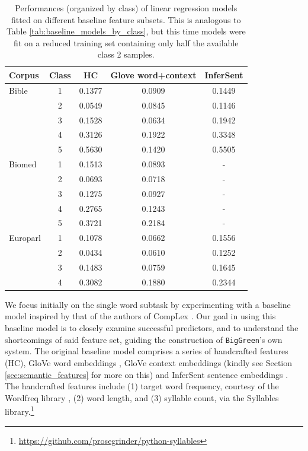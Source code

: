 \documentclass{dcthesis}
\theoremstyle{definition}
\theoremstyle{remark}
\begin{document}
\begin{table}
  \centering
  \begin{tabular}{l|c|c|c|c}
  \hline
  \textbf{Corpus} & \textbf{Class} & \textbf{HC} & \textbf{Glove word+context} & \textbf{InferSent} \\
  \hline
  Bible & 1 & 0.1377 & 0.0909 & 0.1449 \\
  & 2 & 0.0549 & 0.0845 & 0.1146 \\
  & 3 & 0.1528 & 0.0634 & 0.1942 \\
  & 4 & 0.3126 & 0.1922 & 0.3348 \\
  & 5 & 0.5630 & 0.1420 & 0.5505 \\
  \hline
  Biomed & 1 & 0.1513 & 0.0893 & - \\
  & 2 & 0.0693 & 0.0718 & - \\
  & 3 & 0.1275 & 0.0927 & - \\
  & 4 & 0.2765 & 0.1243 & - \\
  & 5 & 0.3721 & 0.2184 & - \\
  \hline
  Europarl & 1 & 0.1078 & 0.0662 & 0.1556 \\
  & 2 & 0.0434 & 0.0610 & 0.1252 \\
  & 3 & 0.1483 & 0.0759 & 0.1645 \\
  & 4 & 0.3082 & 0.1880 & 0.2344 \\
  \hline
  \end{tabular}
  \caption{\label{tab:baseline_models_by_class_reduced} 
  Performances (organized by class) of linear regression models fitted on different baseline feature subsets. This is analogous to Table \ref{tab:baseline_models_by_class}, but this time models were fit on a reduced training set containing only half the available class 2 samples.}
\end{table}

We focus initially on the single word subtask by experimenting with a baseline model inspired by that of the authors of CompLex \citep{shardlow2020complex}. Our goal in using this baseline model is to closely examine successful predictors, and to understand the shortcomings of said feature set, guiding the construction of \texttt{BigGreen}'s own system. The original baseline model comprises a series of handcrafted features (HC), GloVe word embeddings \citep{pennington2014glove}, GloVe context embeddings (kindly see Section \ref{sec:semantic_features} for more on this) and InferSent sentence embeddings \citep{conneau2017supervised}. The handcrafted features include (1) target word frequency, courtesy of the Wordfreq library \citep{speer2018luminosoinsight}, (2) word length, and (3) syllable count, via the Syllables library.\footnote{\url{https://github.com/prosegrinder/python-syllables}} 
\end{document}
